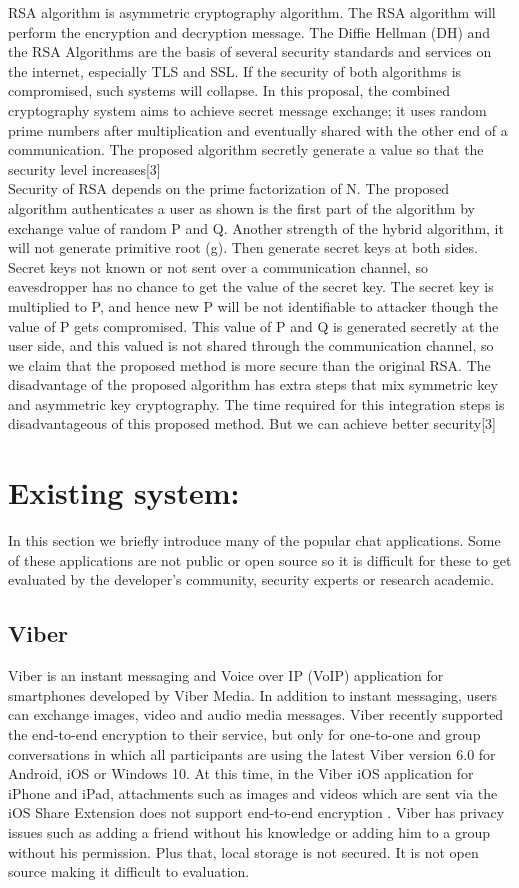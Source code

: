 RSA algorithm is asymmetric cryptography algorithm. The RSA algorithm will perform the encryption and decryption message. The Diffie Hellman (DH) and the RSA Algorithms are the basis of several security standards and services on the internet, especially TLS and SSL. If the security of both algorithms is compromised, such systems will collapse. In this proposal, the combined cryptography system aims to achieve secret message exchange; it uses random prime numbers after multiplication and eventually shared with the other end of a communication. The proposed algorithm secretly generate a value so that the security level increases[3]\\
Security of RSA depends on the prime factorization of N. The proposed algorithm authenticates a user as shown is the first part of the algorithm by exchange value of random P and Q. Another strength of the hybrid algorithm, it will not generate primitive root (g). Then generate secret keys at both sides. Secret keys not known or not sent over a communication channel, so eavesdropper has no chance to get the value of the secret key. The secret key is multiplied to P, and hence new P will be not identifiable to attacker though the value of P gets compromised. This value of P and Q is generated secretly at the user side, and this valued is not shared through the communication channel, so we claim that the proposed method is more secure than the original RSA. The disadvantage of the proposed algorithm has extra steps that mix symmetric key and asymmetric key cryptography. The time required for this integration steps is disadvantageous of this proposed method. But we can achieve better security[3]


\section{Existing system:}
In this section we briefly introduce many of the popular chat applications. Some of these applications are not public or open source so it is difficult for these to get evaluated by the developer’s community, security experts or research academic.

\subsection{Viber}
Viber is an instant messaging and Voice over IP (VoIP) application for smartphones developed by Viber Media. In addition to instant messaging, users can exchange images,
video and audio media messages. Viber recently supported the end-to-end encryption to their service, but only for one-to-one and group conversations in which all
participants are using the latest Viber version 6.0 for Android, iOS or Windows 10. At this time, in the Viber iOS application for iPhone and iPad, attachments such as images and videos which are sent via the iOS Share Extension does not support end-to-end encryption .\cite{shyam} Viber has privacy issues such as adding a friend without his knowledge or adding him to a group without his permission. Plus that, local storage is not secured. It is not
open source making it difficult to evaluation.

